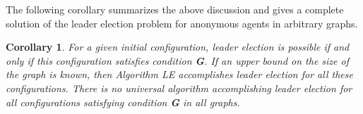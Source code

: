 \documentclass[11pt]{article}
\newtheorem{corollary}{Corollary}[section]
\begin{document}
The following corollary summarizes the above discussion and gives a complete solution of the leader election
problem for anonymous agents in arbitrary graphs.
 



\begin{corollary}
For a given initial configuration, leader election is possible if and only if this
configuration satisfies condition {\bf G}. 
If an upper bound on the size of the graph is known, then Algorithm LE accomplishes leader election for
all these configurations.
There is no universal algorithm accomplishing leader election for all configurations satisfying condition {\bf G} in all graphs.
\end{corollary}







 



  
  
  
     
\end{document}
